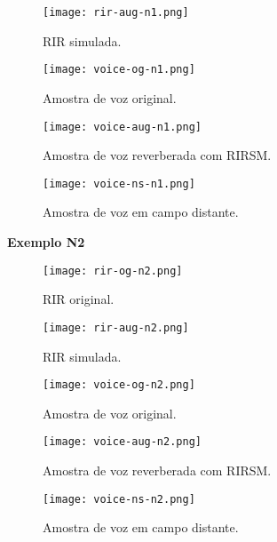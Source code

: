 \begin{figure} [H]
    \centering
    \texttt{[image: rir-aug-n1.png]}
    \caption{RIR simulada.}
    \label{fig-a:rir-aug-n1}
\end{figure} 

\begin{figure} [H]
    \centering
    \texttt{[image: voice-og-n1.png]}
    \caption{Amostra de voz original.}
    \label{fig-a:voice-og-n1}
\end{figure} 

\begin{figure} [H]
    \centering
    \texttt{[image: voice-aug-n1.png]}
    \caption{Amostra de voz reverberada com RIRSM.}
    \label{fig-a:voice-aug-n1}
\end{figure}

\begin{figure} [H]
    \centering
    \texttt{[image: voice-ns-n1.png]}
    \caption{Amostra de voz em campo distante.}
    \label{fig-a:voice-ns-n1}
\end{figure}

\pagebreak
{\Large \textbf{Exemplo N2}}

\begin{figure} [H]
    \centering
    \texttt{[image: rir-og-n2.png]}
    \caption{RIR original.}
    \label{fig-a:rir-og-n2}
\end{figure} 

\begin{figure} [H]
    \centering
    \texttt{[image: rir-aug-n2.png]}
    \caption{RIR simulada.}
    \label{fig-a:rir-aug-n2}
\end{figure} 

\begin{figure} [H]
    \centering
    \texttt{[image: voice-og-n2.png]}
    \caption{Amostra de voz original.}
    \label{fig-a:voice-og-n2}
\end{figure} 

\begin{figure} [H]
    \centering
    \texttt{[image: voice-aug-n2.png]}
    \caption{Amostra de voz reverberada com RIRSM.}
    \label{fig-a:voice-aug-n2}
\end{figure}

\begin{figure} [H]
    \centering
    \texttt{[image: voice-ns-n2.png]}
    \caption{Amostra de voz em campo distante.}
    \label{fig-a:voice-ns-n2}
\end{figure}

